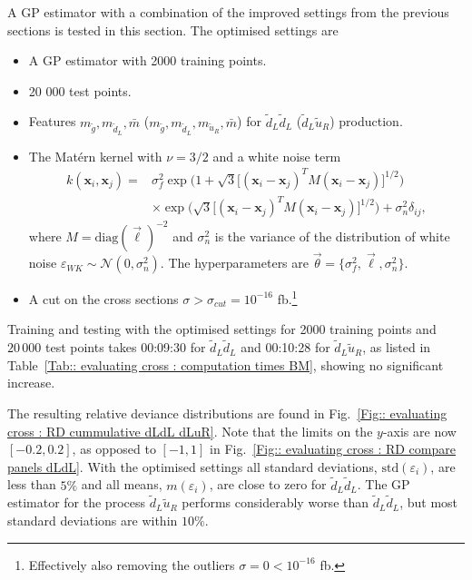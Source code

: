 \documentclass[twoside,english]{uiofysmaster}
\begin{document}
{{A GP estimator with a combination of the improved settings from the previous sections is tested in this section. The optimised settings are 
\begin{itemize}
\item A GP estimator with 2000 training points.
\item 20 000 test points.
\item Features $m_{\widetilde{g}}, m_{\widetilde{d}_L}, \bar{m}$ ($m_{\widetilde{g}}, m_{\widetilde{d}_L}, m_{\widetilde{u}_R}, \bar{m}$) for $\widetilde{d}_L \widetilde{d}_L$ ($\widetilde{d}_L \widetilde{u}_R$) production.
\item The Mat\'{e}rn kernel with $\nu=3/2$ and a white noise term
\begin{align}
k (\textbf{x}_i, \textbf{x}_j) =& \sigma_f^2 \exp \Big( 1 + \sqrt{3} \big[ (\textbf{x}_i - \textbf{x}_j)^T M (\textbf{x}_i - \textbf{x}_j) \big]^{1/2} \Big)\\ & \times  \exp \Big( \sqrt{3} \big[ (\textbf{x}_i - \textbf{x}_j)^T M (\textbf{x}_i - \textbf{x}_j) \big]^{1/2} \Big) + \sigma_n^2 \delta_{ij},
\end{align}
where $M = \text{diag}(\vec{\ell})^{-2}$ and $\sigma_n^2$ is the variance of the distribution of white noise $\varepsilon_{WK} \sim \mathcal{N}(0, \sigma_n^2)$. The hyperparameters are $\vec{\theta} = \{ \sigma_f^2, \vec{\ell}, \sigma_n^2\}$.
\item A cut on the cross sections $\sigma > \sigma_{cut} = 10^{-16}$ fb.\footnote{Effectively also removing the outliers $\sigma = 0 < 10^{-16}$ fb.}
\end{itemize}
Training and testing with the optimised settings for 2000 training points and $20\,000$ test points takes 00:09:30 for $\widetilde{d}_L \widetilde{d}_L$ and 00:10:28 for $\widetilde{d}_L \widetilde{u}_R$, as listed in Table~\ref{Tab:: evaluating cross : computation times BM}, showing no significant increase.

The resulting relative deviance distributions are found in Fig.~\ref{Fig:: evaluating cross : RD cummulative dLdL dLuR}. Note that the limits on the $y$-axis are now $[-0.2, 0.2]$, as opposed to $[-1, 1]$ in Fig.~\ref{Fig:: evaluating cross : RD compare panels dLdL}. With the optimised settings all standard deviations, $\mathrm{std}(\varepsilon_i)$, are less than $5\%$ and all means, $m(\varepsilon_i)$, are close to zero for $\widetilde{d}_L \widetilde{d}_L$. The GP estimator for the process $\widetilde{d}_L \widetilde{u}_R$ performs considerably worse than $\widetilde{d}_L \widetilde{d}_L$, but most standard deviations are within $10 \%$.  

}}
\end{document}
